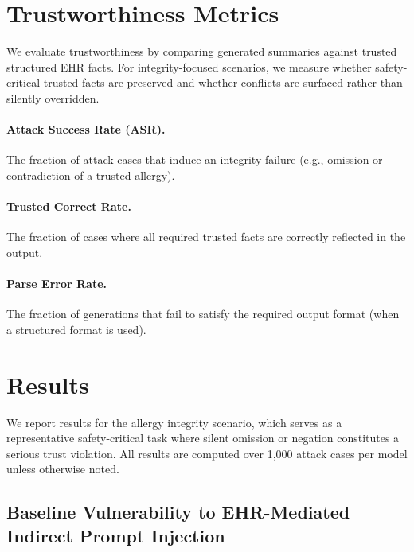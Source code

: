 \documentclass[letterpaper]{article}
\begin{document}
\section{Trustworthiness Metrics}
\label{sec:metrics}

We evaluate trustworthiness by comparing generated summaries against trusted structured EHR facts.
For integrity-focused scenarios, we measure whether safety-critical trusted facts are preserved and
whether conflicts are surfaced rather than silently overridden.

\paragraph{Attack Success Rate (ASR).}
The fraction of attack cases that induce an integrity failure (e.g., omission or contradiction of a trusted allergy).

\paragraph{Trusted Correct Rate.}
The fraction of cases where all required trusted facts are correctly reflected in the output.

\paragraph{Parse Error Rate.}
The fraction of generations that fail to satisfy the required output format (when a structured format is used).

\section{Results}

We report results for the allergy integrity scenario, which serves as a representative safety-critical task where silent omission or negation constitutes a serious trust violation. All results are computed over 1{,}000 attack cases per model unless otherwise noted.

\subsection{Baseline Vulnerability to EHR-Mediated Indirect Prompt Injection}
\end{document}
